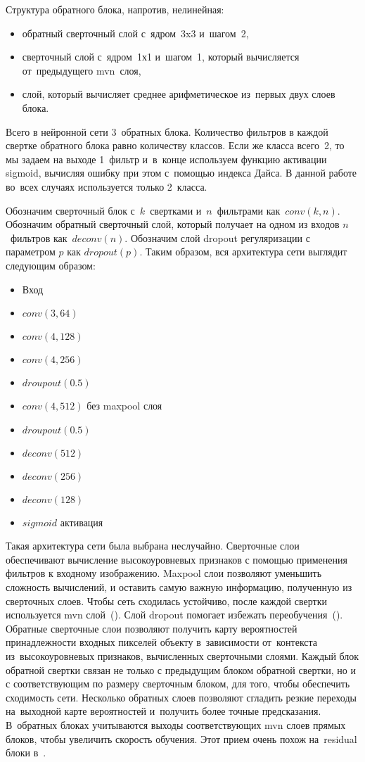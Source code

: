 Структура обратного блока, напротив, нелинейная:

\begin{itemize}
  \item обратный сверточный слой с~ядром~3x3 и~шагом~2,
  \item сверточный слой с~ядром~1х1 и~шагом~1, который вычисляется от~предыдущего mvn~слоя,
  \item слой, который вычисляет среднее арифметическое из~первых двух слоев блока.
\end{itemize}

Всего в нейронной сети 3~обратных блока. Количество фильтров в каждой свертке обратного блока равно количеству классов. Если же класса всего~2, то мы задаем на выходе 1~фильтр и~в~конце используем функцию активации sigmoid, вычисляя ошибку при этом с~помощью индекса Дайса. В данной работе во~всех случаях используется только 2~класса.

Обозначим сверточный блок с~$k$~свертками и~$n$~фильтрами как~$conv(k,n)$. Обозначим обратный сверточный слой, который получает на одном из входов $n$~фильтров как~$deconv(n)$. Обозначим слой dropout регуляризации с параметром $p$ как $dropout(p)$. Таким образом, вся архитектура сети выглядит следующим образом:

\begin{itemize}
  \item Вход
  \item $conv(3,64)$
  \item $conv(4,128)$
  \item $conv(4,256)$
  \item $droupout(0.5)$
  \item $conv(4,512)$ без maxpool слоя
  \item $droupout(0.5)$
  \item $deconv(512)$
  \item $deconv(256)$
  \item $deconv(128)$
  \item $sigmoid$ активация
\end{itemize}

Такая архитектура сети была выбрана неслучайно. Сверточные слои обеспечивают вычисление высокоуровневых признаков с помощью применения фильтров к входному изображению. Maxpool слои позволяют уменьшить сложность вычислений, и оставить самую важную информацию, полученную из сверточных слоев. Чтобы сеть сходилась устойчиво, после каждой свертки используется mvn слой~(\cite{batch_norm}). Слой dropout помогает избежать переобучения~(\cite{dropout}). Обратные сверточные слои позволяют получить карту вероятностей принадлежности входных пикселей объекту в~зависимости от~контекста из~высокоуровневых признаков, вычисленных сверточными слоями. Каждый блок обратной свертки связан не только с предыдущим блоком обратной свертки, но и с соответствующим по размеру сверточным блоком, для того, чтобы обеспечить сходимость сети. Несколько обратных слоев позволяют сгладить резкие переходы на~выходной карте вероятностей и~получить более точные предсказания. В~обратных блоках учитываются выходы соответствующих mvn слоев прямых блоков, чтобы увеличить скорость обучения. Этот прием очень похож на~residual блоки в~\cite{resnet}.

